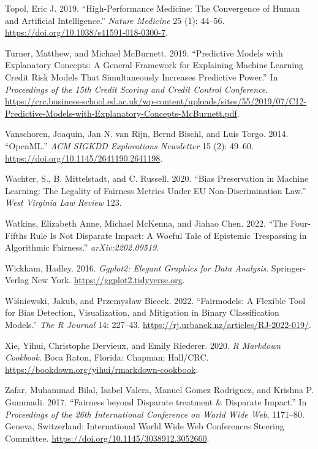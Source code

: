 \begin{CSLReferences}{1}{0}
\leavevmode{}%
Topol, Eric J. 2019. {``High-Performance Medicine: The Convergence of Human and Artificial Intelligence.''} \emph{Nature Medicine} 25 (1): 44--56. \url{https://doi.org/10.1038/s41591-018-0300-7}.

\leavevmode{}%
Turner, Matthew, and Michael McBurnett. 2019. {``Predictive Models with Explanatory Concepts: A General Framework for Explaining Machine Learning Credit Risk Models That Simultaneously Increases Predictive Power.''} In \emph{Proceedings of the 15th Credit Scoring and Credit Control Conference}. \url{https://crc.business-school.ed.ac.uk/wp-content/uploads/sites/55/2019/07/C12-Predictive-Models-with-Explanatory-Concepts-McBurnett.pdf}.

\leavevmode{}%
Vanschoren, Joaquin, Jan N. van Rijn, Bernd Bischl, and Luis Torgo. 2014. {``{OpenML}.''} \emph{{ACM} {SIGKDD} Explorations Newsletter} 15 (2): 49--60. \url{https://doi.org/10.1145/2641190.2641198}.

\leavevmode{}%
Wachter, S., B. Mittelstadt, and C. Russell. 2020. {``Bias Preservation in Machine Learning: The Legality of Fairness Metrics Under {EU} Non-Discrimination Law.''} \emph{West Virginia Law Review} 123.

\leavevmode{}%
Watkins, Elizabeth Anne, Michael McKenna, and Jiahao Chen. 2022. {``The Four-Fifths Rule Is Not Disparate Impact: A Woeful Tale of Epistemic Trespassing in Algorithmic Fairness.''} \emph{arXiv:2202.09519}.

\leavevmode{}%
Wickham, Hadley. 2016. \emph{Ggplot2: Elegant Graphics for Data Analysis}. Springer-Verlag New York. \url{https://ggplot2.tidyverse.org}.

\leavevmode{}%
Wiśniewski, Jakub, and Przemysław Biecek. 2022. {``Fairmodels: A Flexible Tool for Bias Detection, Visualization, and Mitigation in Binary Classification Models.''} \emph{The R Journal} 14: 227--43. \url{https://rj.urbanek.nz/articles/RJ-2022-019/}.

\leavevmode{}%
Xie, Yihui, Christophe Dervieux, and Emily Riederer. 2020. \emph{R Markdown Cookbook}. Boca Raton, Florida: Chapman; Hall/CRC. \url{https://bookdown.org/yihui/rmarkdown-cookbook}.

\leavevmode{}%
Zafar, Muhammad Bilal, Isabel Valera, Manuel Gomez Rodriguez, and Krishna P. Gummadi. 2017. {``{Fairness beyond Disparate treatment {\&} Disparate Impact}.''} In \emph{Proceedings of the 26th International Conference on World Wide Web}, 1171--80. Geneva, Switzerland: International World Wide Web Conferences Steering Committee. \url{https://doi.org/10.1145/3038912.3052660}.

\end{CSLReferences}

